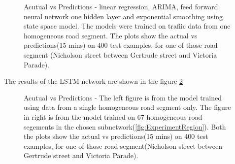 \begin{figure}[h]
    \caption[Acutual vs Predictions, using currently popular methods]{Acutual vs Predictions -
    linear regression, ARIMA, feed forward neural network one hidden layer and exponential
    smoothing using state space model. The models were trained on trafiic data from one homogeneous
    road segment. The plots show the actual vs predictions(15 mins) on 400 test examples, for one
    of those road segment (Nicholson street between Gertrude street and Victoria Parade).}
    \label{fig:benchmarkModels}
\end{figure}

The results of the LSTM network are shown in the figure \ref{fig:LSTMActualPredicted}

\begin{figure}[h]
    \centering

    \qquad

    \caption[Acutual vs Predictions, using deep LSTM networks]{Acutual vs Predictions - The left
    figure is from the model trained using data from a single homogeneous road segment only. The
    figure in right is from the model trained on 67 homogeneous road segements in the chosen
    subnetwork(\ref{fig:ExperimentRegion}). Both the plots show the actual vs predictions(15
    mins) on 400 test examples, for one of those road segment(Nicholson street between Gertrude
    street and Victoria Parade).}
    \label{fig:LSTMActualPredicted}
\end{figure}

